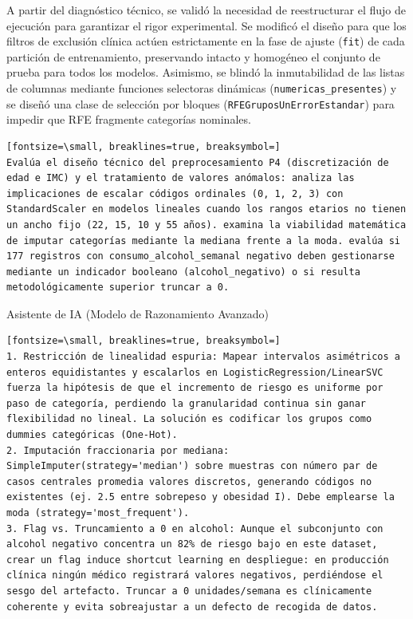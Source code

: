 \documentclass[12pt,a4paper,oneside]{book}
\begin{document}
\begin{iaanalisis}
A partir del diagnóstico técnico, se validó la necesidad de reestructurar el flujo de ejecución para garantizar el rigor experimental. Se modificó el diseño para que los filtros de exclusión clínica actúen estrictamente en la fase de ajuste (\texttt{fit}) de cada partición de entrenamiento, preservando intacto y homogéneo el conjunto de prueba para todos los modelos. Asimismo, se blindó la inmutabilidad de las listas de columnas mediante funciones selectoras dinámicas (\texttt{numericas\_presentes}) y se diseñó una clase de selección por bloques (\texttt{RFEGruposUnErrorEstandar}) para impedir que RFE fragmente categorías nominales.
\end{iaanalisis}

\begin{iaprompt}
\begin{Verbatim}[fontsize=\small, breaklines=true, breaksymbol=]
Evalúa el diseño técnico del preprocesamiento P4 (discretización de edad e IMC) y el tratamiento de valores anómalos: analiza las implicaciones de escalar códigos ordinales (0, 1, 2, 3) con StandardScaler en modelos lineales cuando los rangos etarios no tienen un ancho fijo (22, 15, 10 y 55 años). examina la viabilidad matemática de imputar categorías mediante la mediana frente a la moda. evalúa si 177 registros con consumo_alcohol_semanal negativo deben gestionarse mediante un indicador booleano (alcohol_negativo) o si resulta metodológicamente superior truncar a 0.
\end{Verbatim}
\end{iaprompt}
\begin{iaresp}{Asistente de IA (Modelo de Razonamiento Avanzado)}
\begin{Verbatim}[fontsize=\small, breaklines=true, breaksymbol=]
1. Restricción de linealidad espuria: Mapear intervalos asimétricos a enteros equidistantes y escalarlos en LogisticRegression/LinearSVC fuerza la hipótesis de que el incremento de riesgo es uniforme por paso de categoría, perdiendo la granularidad continua sin ganar flexibilidad no lineal. La solución es codificar los grupos como dummies categóricas (One-Hot).
2. Imputación fraccionaria por mediana: SimpleImputer(strategy='median') sobre muestras con número par de casos centrales promedia valores discretos, generando códigos no existentes (ej. 2.5 entre sobrepeso y obesidad I). Debe emplearse la moda (strategy='most_frequent').
3. Flag vs. Truncamiento a 0 en alcohol: Aunque el subconjunto con alcohol negativo concentra un 82% de riesgo bajo en este dataset, crear un flag induce shortcut learning en despliegue: en producción clínica ningún médico registrará valores negativos, perdiéndose el sesgo del artefacto. Truncar a 0 unidades/semana es clínicamente coherente y evita sobreajustar a un defecto de recogida de datos.
\end{Verbatim}
\end{iaresp}
\end{document}
